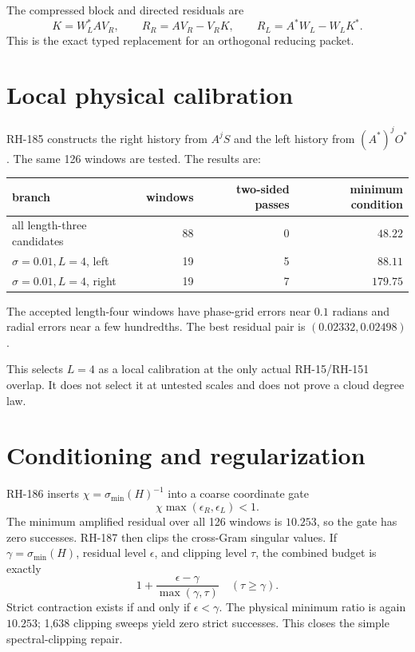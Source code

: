 \documentclass[12pt]{article}
\theoremstyle{remark}
\begin{document}
The compressed block and directed residuals are
\begin{equation}\label{eq:directed}
 K=W_L^*AV_R,
 \qquad
 R_R=AV_R-V_RK,
 \qquad
 R_L=A^*W_L-W_LK^*.
\end{equation}
This is the exact typed replacement for an orthogonal reducing packet.

\section{Local physical calibration}

RH-185 constructs the right history from $A^jS$ and the left history from
$(A^*)^jO^*$.  The same 126 windows are tested.  The results are:
\begin{center}
\begin{tabular}{lrrr}
\toprule
branch & windows & two-sided passes & minimum condition\\
\midrule
all length-three candidates & 88 & 0 & $48.22$\\
$\sigma=0.01,L=4$, left & 19 & 5 & $88.11$\\
$\sigma=0.01,L=4$, right & 19 & 7 & $179.75$\\
\bottomrule
\end{tabular}
\end{center}
The accepted length-four windows have phase-grid errors near $0.1$ radians
and radial errors near a few hundredths.  The best residual pair is
$(0.02332,0.02498)$.

This selects $L=4$ as a local calibration at the only actual RH-15/RH-151
overlap.  It does not select it at untested scales and does not prove a cloud
degree law.

\section{Conditioning and regularization}

RH-186 inserts $\chi=\sigma_{\min}(H)^{-1}$ into a coarse coordinate gate
\begin{equation}\label{eq:amp}
 \chi\max(\epsilon_R,\epsilon_L)<1.
\end{equation}
The minimum amplified residual over all 126 windows is $10.253$, so the gate
has zero successes.  RH-187 then clips the cross-Gram singular values.  If
$\gamma=\sigma_{\min}(H)$, residual level $\epsilon$, and clipping level
$\tau$, the combined budget is exactly
\begin{equation}\label{eq:clip}
 1+\frac{\epsilon-\gamma}{\max(\gamma,\tau)}
 \quad (\tau\ge\gamma).
\end{equation}
Strict contraction exists if and only if $\epsilon<\gamma$.  The physical
minimum ratio is again $10.253$; 1,638 clipping sweeps yield zero strict
successes.  This closes the simple spectral-clipping repair.
\end{document}

